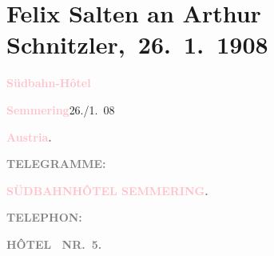 

\renewcommand{\erwaehntePersonen}{Personen: Samuel Fischer, Hedwig Fischer, Margarethe Kainz, Josef Kainz, Anna Katharina Rehmann, Felix Salten, Ottilie Salten, Paul Salten, Paula Schlenther, Paul Schlenther, Olga Schnitzler, Heinrich Schnitzler,  W. Fred}
\renewcommand{\erwaehnteInstitutionen}{Institutionen: Franz-Grillparzer-Preis}
\renewcommand{\erwaehnteOrte}{Orte: Semmering, Südbahnhotel, Wien, Österreich}
\renewcommand{\erwaehnteWerke}{Werke: Der Weg ins Freie. Roman, Die neue Rundschau, Tagebuch}
\section[ Felix Salten an Arthur Schnitzler, 26. 1. 1908]{Felix Salten an Arthur Schnitzler, 26. 1. 1908}
\nopagebreak{}
\rehead{ }\normalsize\beginnumbering{}
\toendnotes[C]{\smallbreak\pagebreak[2]}
\toendnotes[C]{\smallbreak}
\pstart
           \noindent{}{\pb}\textcolor{gray}{\textbf{\textcolor{pink}{Südbahn-Hôtel}{}\ledrightnote{\textcolor{pink}{Südbahnhotel}}}}\pend
           
\pstart
           \textcolor{gray}{\textbf{\textcolor{pink}{Semmering}{}\ledrightnote{\textcolor{pink}{Semmering}}}}\hfill 26./1. 08\pend
           
\pstart
           \textcolor{gray}{\textbf{\textcolor{pink}{Austria}{}\ledrightnote{\textcolor{pink}{Österreich}}.}}\pend
           
\pstart
           \textcolor{gray}{\textbf{\textbf{TELEGRAMME:}}}\pend
           
\pstart
           \textcolor{gray}{\textbf{\textbf{\textcolor{pink}{SÜDBAHNHÔTEL SEMMERING}{}\ledrightnote{\textcolor{pink}{Südbahnhotel}}.}}}\pend
           
\pstart
           \textcolor{gray}{\textbf{TELEPHON:}}\pend
           
\pstart
           \textcolor{gray}{\textbf{HÔTEL {\dotsfour} NR. 5.}}\pend
           
